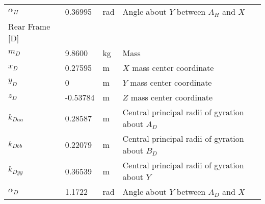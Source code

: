 \documentclass{bmd2019p}
\begin{document}
\begin{table}
\begin{tabular}{llll}
    $\alpha_H$ & 0.36995 & \si{\radian} & Angle about $Y$ between $A_H$ and $X$ \\
    Rear Frame [D] & & \\
    \midrule
    $m_D$ &  9.8600 & \si{\kilogram}    & Mass \\
    $x_D$ &  0.27595 & \si{\meter}      & $X$ mass center coordinate \\
    $y_D$ & 0 & \si{\meter}             & $Y$ mass center coordinate \\
    $z_D$ & -0.53784 & \si{\meter}      & $Z$ mass center coordinate \\
    $k_{Daa}$ &  0.28587 & \si{\meter}  & Central principal radii of gyration about $A_D$ \\
    $k_{Dbb}$ &  0.22079 & \si{\meter}  & Central principal radii of gyration about $B_D$ \\
    $k_{Dyy}$ &  0.36539 & \si{\meter}  & Central principal radii of gyration about $Y$ \\
    $\alpha_D$ &  1.1722 & \si{\radian} & Angle about $Y$ between $A_D$ and $X$ \\
    \bottomrule
  \end{tabular}
\end{table}
\end{document}
